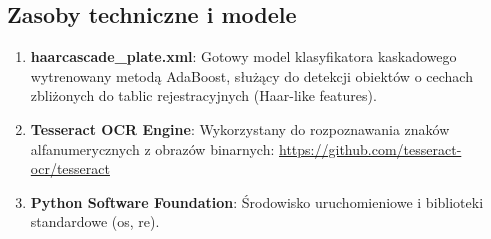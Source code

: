 \documentclass[12pt,a4paper]{article}
\begin{document}
\subsection{Zasoby techniczne i modele}
\begin{enumerate}
    \item \textbf{haarcascade\_plate.xml}: Gotowy model klasyfikatora kaskadowego wytrenowany metodą AdaBoost, służący do detekcji obiektów o cechach zbliżonych do tablic rejestracyjnych (Haar-like features).
    \item \textbf{Tesseract OCR Engine}: Wykorzystany do rozpoznawania znaków alfanumerycznych z obrazów binarnych:
    \url{https://github.com/tesseract-ocr/tesseract}
    \item \textbf{Python Software Foundation}: Środowisko uruchomieniowe i biblioteki standardowe (os, re).
\end{enumerate}
\end{document}
